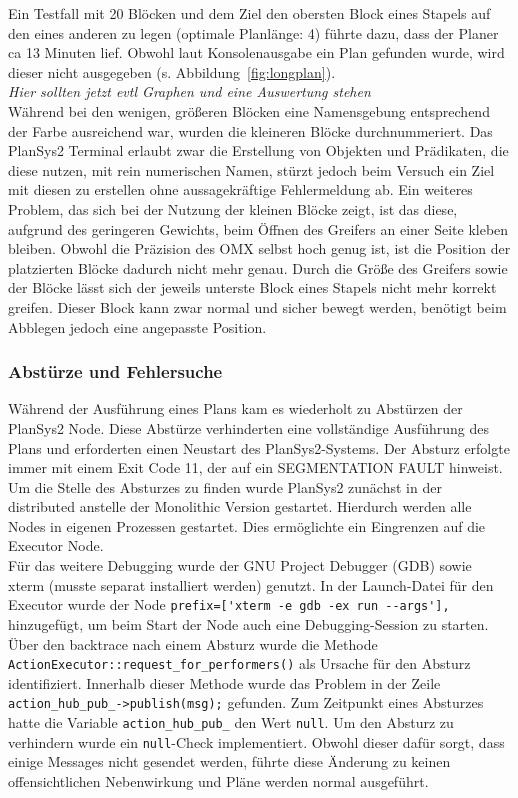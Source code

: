 Ein Testfall mit 20 Blöcken und dem Ziel den obersten Block eines Stapels auf den eines anderen zu legen (optimale Planlänge: 4) führte dazu, dass der Planer ca 13 Minuten lief.
Obwohl laut Konsolenausgabe ein Plan gefunden wurde, wird dieser nicht ausgegeben (s. Abbildung~\ref{fig:longplan}).\\
\emph{Hier sollten jetzt evtl Graphen und eine Auswertung stehen}\\
Während bei den wenigen, größeren Blöcken eine Namensgebung entsprechend der Farbe ausreichend war, wurden die kleineren Blöcke durchnummeriert.
Das \ac{PlanSys2} Terminal erlaubt zwar die Erstellung von Objekten und Prädikaten, die diese nutzen, mit rein numerischen Namen, stürzt jedoch beim Versuch ein Ziel mit diesen zu erstellen ohne aussagekräftige Fehlermeldung ab.
Ein weiteres Problem, das sich bei der Nutzung der kleinen Blöcke zeigt, ist das diese, aufgrund des geringeren Gewichts, beim Öffnen des Greifers an einer Seite kleben bleiben.
Obwohl die Präzision des OMX selbst hoch genug ist, ist die Position der platzierten Blöcke dadurch nicht mehr genau.
Durch die Größe des Greifers sowie der Blöcke lässt sich der jeweils unterste Block eines Stapels nicht mehr korrekt greifen.
Dieser Block kann zwar normal und sicher bewegt werden, benötigt beim Abblegen jedoch eine angepasste Position.
\subsubsection{Abstürze und Fehlersuche}
Während der Ausführung eines Plans kam es wiederholt zu Abstürzen der \ac{PlanSys2} Node.
Diese Abstürze verhinderten eine vollständige Ausführung des Plans und erforderten einen Neustart des \ac{PlanSys2}-Systems.
Der Absturz erfolgte immer mit einem Exit Code 11, der auf ein SEGMENTATION FAULT hinweist.
Um die Stelle des Absturzes zu finden wurde \ac{PlanSys2} zunächst in der distributed anstelle der Monolithic Version gestartet.
Hierdurch werden alle Nodes in eigenen Prozessen gestartet.
Dies ermöglichte ein Eingrenzen auf die Executor Node.\\
Für das weitere Debugging wurde der GNU Project Debugger (GDB) sowie xterm (musste separat installiert werden) genutzt.
In der Launch-Datei für den Executor wurde der Node \verb|prefix=['xterm -e gdb -ex run --args'],| hinzugefügt, um beim Start der Node auch eine Debugging-Session zu starten.\\
Über den backtrace nach einem Absturz wurde die Methode\\\verb|ActionExecutor::request_for_performers()| als Ursache für den Absturz identifiziert.
Innerhalb dieser Methode wurde das Problem in der Zeile\\\verb|action_hub_pub_->publish(msg);| gefunden.
Zum Zeitpunkt eines Absturzes hatte die Variable \verb|action_hub_pub_| den Wert \verb|null|.
Um den Absturz zu verhindern wurde ein \verb|null|-Check implementiert.
Obwohl dieser dafür sorgt, dass einige Messages nicht gesendet werden, führte diese Änderung zu keinen offensichtlichen Nebenwirkung und Pläne werden normal ausgeführt.

